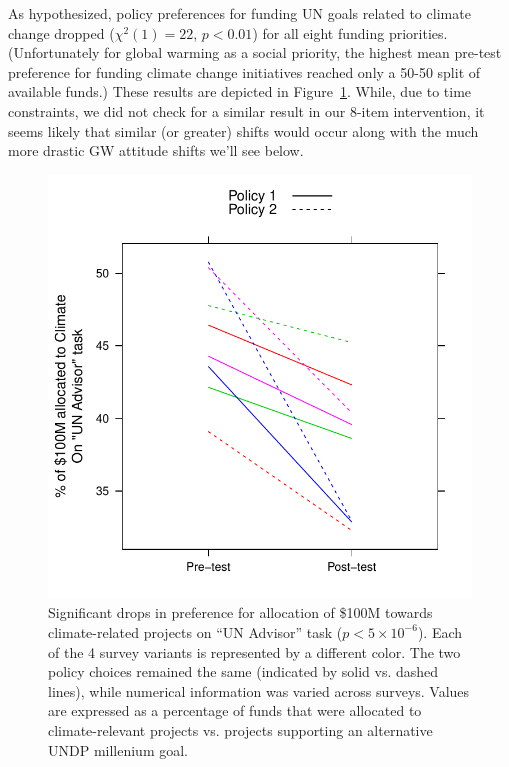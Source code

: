 As hypothesized, policy preferences for funding UN goals related to climate
change dropped ($\chi^2(1)=22$, $p<0.01$) for all eight funding priorities.
(Unfortunately for global warming as a social priority, the highest mean
pre-test preference for funding climate change initiatives reached only a 50-50
split of available funds.) These results are depicted in
Figure~\ref{fig:evil-alloc}. While, due to time constraints, we did not check
for a similar result in our 8-item intervention, it seems likely that similar
(or greater) shifts would occur along with the much more drastic GW attitude
shifts we'll see below.

\begin{figure}
    \centering
    \includegraphics{evil-alloc.pdf}
    \caption{Significant drops in preference for allocation of \$100M towards
        climate-related projects on “UN Advisor” task ($p<5\times10^{-6}$). Each
        of the 4 survey variants is represented by a different color. The two
        policy choices remained the same (indicated by solid vs. dashed lines),
        while numerical information was varied across surveys. Values are
        expressed as a percentage of funds that were allocated to
        climate-relevant projects vs. projects supporting an alternative UNDP
        millenium goal.}
    \label{fig:evil-alloc}
\end{figure}

